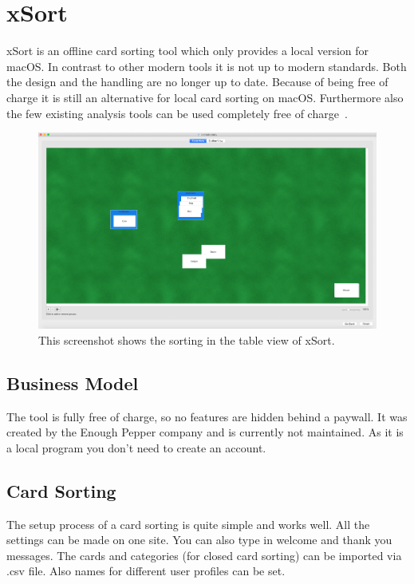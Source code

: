 \chapter{xSort}

\label{chap:tool}
xSort is an offline card sorting tool which only provides a local version for macOS. In contrast to 
other modern tools it is not up to modern standards. Both the design and the handling are no
longer up to date. Because of being free of charge it is still an alternative for local card sorting on 
macOS. Furthermore also the few existing analysis tools can be used completely free of charge~\parencite{xSort}.

\begin{figure}[h] 
\centering
\includegraphics[keepaspectratio,width=\linewidth,height=\halfh]{images/xsort-sorting.png}
\caption[xSort Application] { This screenshot shows the sorting in the table view of xSort.
 }
\label{fig:xSort-sorting}
\end{figure}


\section{Business Model}
The tool is fully free of charge, so no features are hidden behind a paywall. It was created by the 
Enough Pepper company and is currently not maintained. As it is a local program you don't need 
to create an account.

\section{Card Sorting}
The setup process of a card sorting is quite simple and works well. All the settings can be made 
on one site. You can also type in welcome and thank you messages. The cards and categories 
(for closed card sorting) can be imported via .csv file. Also names for different user profiles can be 
set.

